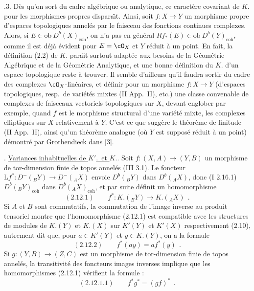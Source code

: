 \medskip

.3. D\`{e}s qu'on sort du cadre alg\'{e}brique ou analytique, ce caract\`{e}re covariant de $K.$ pour les morphismes propres dispara\"{\i}t. Ainsi, soit $f : X \longrightarrow Y$ un morphisme propre d'espaces topologiques annel\'{e}s par le faisceau des fonctions continues complexes. Alors, si $E \in \mathrm{ob}\ D^b(X)_{\mathrm{coh}}$, on n'a pas en g\'{e}n\'{e}ral $Rf_*(E) \in \mathrm{ob}\ D^b(Y)_{\mathrm{coh}}$, comme il est d\'{e}j\`{a} \'{e}vident pour $E = \cO_X$ et $Y$ r\'{e}duit \`{a} un point. En fait, la d\'{e}finition (2.2) de $K.$ para\"{\i}t surtout adapt\'{e}e aux besoins de la G\'{e}om\'{e}trie Alg\'{e}brique et de la G\'{e}om\'{e}trie Analytique, et une bonne d\'{e}finition du $K.$ d'un espace topologique reste \`{a} trouver. Il semble d'ailleurs qu'il faudra sortir du cadre des complexes $\cO_X$-lin\'{e}aires, et d\'{e}finir pour un morphisme $f : X \longrightarrow Y$ (d'espaces topologiques, resp.\ de vari\'{e}t\'{e}s mixtes (II App.\ II), etc.) une classe convenable de complexes de faisceaux vectoriels topologiques sur $X$, devant englober par exemple, quand $f$ est le morphisme structural d'une vari\'{e}t\'{e} mixte, les complexes elliptiques sur $X$ relativement \`{a} $Y$. C'est ce que sugg\`{e}re le th\'{e}or\`{e}me de finitude (II App.\ II), ainsi qu'un th\'{e}or\`{e}me analogue (o\`{u} $Y$ est suppos\'{e} r\'{e}duit \`{a} un point) d\'{e}montr\'{e} par Grothendieck dans [3].

\medskip

. \underline{Variances inhabituelles de $K'$.\ et $K.$}. Soit $f : (X, A) \longrightarrow (Y, B)$ un morphisme de tor-dimension finie de topos annel\'{e}s (III 3.1). Le foncteur $\mathrm{L}f^* : D^-({}_B Y) \longrightarrow D^-({}_A X)$ envoie $D^b({}_B Y)$ dans $D^b({}_A X)$, donc (I 2.16.1) $D^b({}_B Y)_{\mathrm{coh}}$ dans $D^b({}_A X)_{\mathrm{coh}}$, et par suite d\'{e}finit un homomorphisme
\[
\mathrm{(2.12.1)} \qquad f^* : K.({}_B Y) \longrightarrow K.({}_A X)\ \ .
\]
Si $A$ et $B$ sont commutatifs, la commutation de l'image inverse au produit tensoriel montre que l'homomorphisme (2.12.1) est compatible avec les structures de modules de $K.(Y)$ et $K.(X)$ sur $K'(Y)$ et $K'(X)$ respectivement (2.10), autrement dit que, pour $a \in K'(Y)$ et $y \in K.(Y)$, on a la formule
\[
\mathrm{(2.12.2)} \qquad f^*(ay) = af^*(y)\ \ .
\]
Si $g : (Y, B) \longrightarrow (Z, C)$ est un morphisme de tor-dimension finie de topos annel\'{e}s, la transitivit\'{e} des foncteurs images inverses implique que les homomorphismes (2.12.1) v\'{e}rifient la formule :
\[
\mathrm{(2.12.1.1)} \qquad f^*g^* = (gf)^*\ \ .
\]


